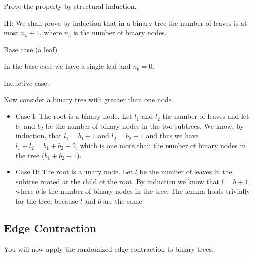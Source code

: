 \begin{problem}
Prove the property by structural induction.

\ask IH: 
\sol 
We shall prove by induction that in a binary tree the number of
leaves is at most $n_b + 1$, where $n_b$ is the number of binary nodes.

\ask Base case (a leaf)

\sol
In the base case we have a single leaf and $n_b = 0$.

\ask Inductive case:

\sol

Now consider a binary tree with greater than one node. 

\begin{itemize}
\item Case I:  The root is a binary node. Let $l_1$ and $l_2$ the number of leaves
and let $b_1$ and $b_2$ be the number of binary nodes in the two
subtrees.  We know, by induction, that $l_1 = b_1 + 1$ and $l_2 = b_2
+ 1$ and thus we have $l_1 + l_2 = b_1 + b_2 + 2$, which is one more
than the number of binary nodes in the tree ($b_1 + b_2 + 1$).

\item Case II: The root is a unary node.  Let $l$ be the number of
leaves in the subtree rooted at the child of the root. By induction we
know that $l = b + 1$, where $b$ is the number of binary nodes in the
tree. The lemma holds trivially for the tree, because $l$ and $b$ are
the same.
\end{itemize}
\end{problem}


\subsection{Edge Contraction}
You will now apply the randomized edge contraction to binary trees.

